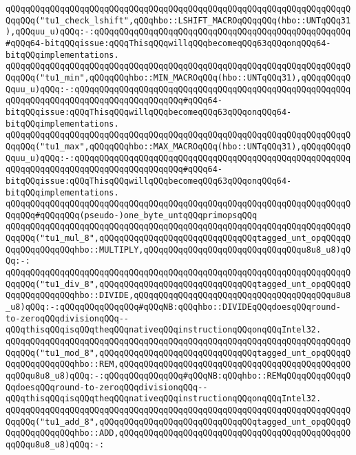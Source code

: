 \verb|qQQqqQQqqQQqqQQqqQQqqQQqqQQqqQQqqQQqqQQqqQQqqQQqqQQqqQQqqQQqqQQqqQQqqQQqqQQq("tu1_check_lshift",qQQqhbo::LSHIFT_MACROqQQqqQQq(hbo::UNTqQQq31),qQQquu_u)qQQq:-:qQQqqQQqqQQqqQQqqQQqqQQqqQQqqQQqqQQqqQQqqQQqqQQqqQQq#qQQq64-bitqQQqissue:qQQqThisqQQqwillqQQqbecomeqQQq63qQQqonqQQq64-bitqQQqimplementations.|\newline
\newline
\verb|qQQqqQQqqQQqqQQqqQQqqQQqqQQqqQQqqQQqqQQqqQQqqQQqqQQqqQQqqQQqqQQqqQQqqQQqqQQq("tu1_min",qQQqqQQqhbo::MIN_MACROqQQq(hbo::UNTqQQq31),qQQqqQQqqQQquu_u)qQQq:-:qQQqqQQqqQQqqQQqqQQqqQQqqQQqqQQqqQQqqQQqqQQqqQQqqQQqqQQqqQQqqQQqqQQqqQQqqQQqqQQqqQQqqQQqqQQq#qQQq64-bitqQQqissue:qQQqThisqQQqwillqQQqbecomeqQQq63qQQqonqQQq64-bitqQQqimplementations.|\newline
\verb|qQQqqQQqqQQqqQQqqQQqqQQqqQQqqQQqqQQqqQQqqQQqqQQqqQQqqQQqqQQqqQQqqQQqqQQqqQQq("tu1_max",qQQqqQQqhbo::MAX_MACROqQQq(hbo::UNTqQQq31),qQQqqQQqqQQquu_u)qQQq:-:qQQqqQQqqQQqqQQqqQQqqQQqqQQqqQQqqQQqqQQqqQQqqQQqqQQqqQQqqQQqqQQqqQQqqQQqqQQqqQQqqQQqqQQqqQQq#qQQq64-bitqQQqissue:qQQqThisqQQqwillqQQqbecomeqQQq63qQQqonqQQq64-bitqQQqimplementations.|\newline
\newline
\verb|qQQqqQQqqQQqqQQqqQQqqQQqqQQqqQQqqQQqqQQqqQQqqQQqqQQqqQQqqQQqqQQqqQQqqQQqqQQq#qQQqqQQq(pseudo-)one_byte_untqQQqprimopsqQQq|\newline
\verb|qQQqqQQqqQQqqQQqqQQqqQQqqQQqqQQqqQQqqQQqqQQqqQQqqQQqqQQqqQQqqQQqqQQqqQQqqQQq("tu1_mul_8",qQQqqQQqqQQqqQQqqQQqqQQqqQQqqQQqtagged_unt_opqQQqqQQqqQQqqQQqqQQqhbo::MULTIPLY,qQQqqQQqqQQqqQQqqQQqqQQqqQQqqQQqu8u8_u8)qQQq:-:|\newline
\verb|qQQqqQQqqQQqqQQqqQQqqQQqqQQqqQQqqQQqqQQqqQQqqQQqqQQqqQQqqQQqqQQqqQQqqQQqqQQq("tu1_div_8",qQQqqQQqqQQqqQQqqQQqqQQqqQQqqQQqtagged_unt_opqQQqqQQqqQQqqQQqqQQqhbo::DIVIDE,qQQqqQQqqQQqqQQqqQQqqQQqqQQqqQQqqQQqqQQqu8u8_u8)qQQq:-:qQQqqQQqqQQqqQQq#qQQqNB:qQQqhbo::DIVIDEqQQqdoesqQQqround-to-zeroqQQqdivisionqQQq--qQQqthisqQQqisqQQqtheqQQqnativeqQQqinstructionqQQqonqQQqIntel32.|\newline
\verb|qQQqqQQqqQQqqQQqqQQqqQQqqQQqqQQqqQQqqQQqqQQqqQQqqQQqqQQqqQQqqQQqqQQqqQQqqQQq("tu1_mod_8",qQQqqQQqqQQqqQQqqQQqqQQqqQQqqQQqtagged_unt_opqQQqqQQqqQQqqQQqqQQqhbo::REM,qQQqqQQqqQQqqQQqqQQqqQQqqQQqqQQqqQQqqQQqqQQqqQQqqQQqu8u8_u8)qQQq:-:qQQqqQQqqQQqqQQq#qQQqNB:qQQqhbo::REMqQQqqQQqqQQqqQQqdoesqQQqround-to-zeroqQQqdivisionqQQq--qQQqthisqQQqisqQQqtheqQQqnativeqQQqinstructionqQQqonqQQqIntel32.|\newline
\verb|qQQqqQQqqQQqqQQqqQQqqQQqqQQqqQQqqQQqqQQqqQQqqQQqqQQqqQQqqQQqqQQqqQQqqQQqqQQq("tu1_add_8",qQQqqQQqqQQqqQQqqQQqqQQqqQQqqQQqtagged_unt_opqQQqqQQqqQQqqQQqqQQqhbo::ADD,qQQqqQQqqQQqqQQqqQQqqQQqqQQqqQQqqQQqqQQqqQQqqQQqqQQqu8u8_u8)qQQq:-:|\newline
